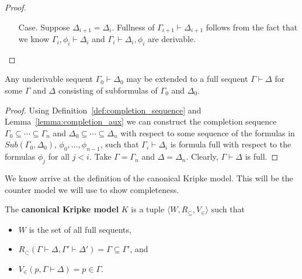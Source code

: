 \documentclass{article}
\begin{document}
\begin{proof}
\begin{itemize}
\begin{itemize}
\begin{itemize}
      \item[Case.] Suppose $\Delta_{i+1} = \Delta_{i}$.  Fullness of $\Gamma_{i+1} \vdash \Delta_{i+1}$
        follows from the fact that we know $\Gamma_i,\phi_i \vdash \Delta_i$ and
        $\Gamma_i \vdash \Delta_i,\phi_i$ are derivable.  
      \end{itemize}

    \end{itemize}

  \end{itemize}

\end{proof}

\begin{lemma}[Completion]
  \label{lemma:completion}
  Any underivable sequent $\Gamma_0 \vdash \Delta_0$ may be extended to a full sequent
  $\Gamma \vdash \Delta$ for some $\Gamma$ and $\Delta$ consisting of subformulas of 
  $\Gamma_0$ and $\Delta_0$.
\end{lemma}
\begin{proof}
  Using Definition~\ref{def:completion_sequence} and Lemma~\ref{lemma:completion_aux} we 
  can construct the completion sequence $\Gamma_0 \subseteq \cdots \subseteq \Gamma_n$ and
  $\Delta_0 \subseteq \cdots \subseteq \Delta_n$ with respect to some sequence of
  the formulas in $Sub(\Gamma_0,\Delta_0)$, $\phi_0,\ldots ,\phi_{n-1}$, such that 
  $\Gamma_i \vdash \Delta_i$ is formula full with respect to the formulas $\phi_j$ for all
  $j < i$.  Take $\Gamma = \Gamma_n$ and $\Delta = \Delta_n$.  
  Clearly, $\Gamma \vdash \Delta$ is full.  
\end{proof}

We know arrive at the definition of the canonical Kripke model. This
will be the counter model we will use to show completeness.

\begin{definition}
  \label{def:canon_model}
  The \textbf{canonical Kripke model} $K$ is a tuple $\langle W, R_\subseteq, V_{\in} \rangle$
  such that 
  \begin{center}
    \begin{itemize}
    \item $W$ is the set of all full sequents,
    \item $R_\subset(\Gamma \vdash \Delta,\Gamma' \vdash \Delta') = \Gamma \subseteq \Gamma'$, and
    \item $V_\in(p, \Gamma \vdash \Delta) = p \in \Gamma$.
    \end{itemize}
  \end{center}
\end{definition}
\end{document}

